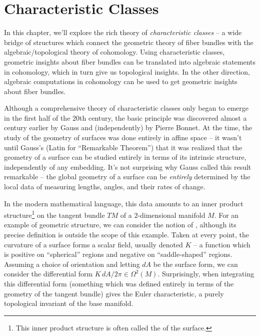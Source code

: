 \chapter{Characteristic Classes}\label{chapter:characteristic_classes}

In this chapter, we'll explore the rich theory of \emph{characteristic classes} -- a wide bridge of structures which connect the geometric theory of fiber bundles with the algebraic/topological theory of cohomology.
Using characteristic classes, geometric insights about fiber bundles can be translated into algebraic statements in cohomology, which in turn give us topological insights. In the other direction, algebraic computations in cohomology can be used to get geometric insights about fiber bundles.

Although a comprehensive theory of characteristic classes only began to emerge in the first half of the 20th century, the basic principle was discovered almost a century earlier by Gauss and (independently) by Pierre Bonnet. At the time, the study of the geometry of surfaces was done entirely in affine space -- it wasn't until Gauss's  (Latin for ``Remarkable Theorem'') that it was realized that the geometry of a surface can be studied entirely in terms of its intrinsic structure, independently of any embedding.
It's not surprising why Gauss called this result remarkable -- the global geometry of a surface can be \emph{entirely} determined by the local data of measuring lengths, angles, and their rates of change.

In the modern mathematical language, this data amounts to an inner product structure\footnote{This inner product structure is often called the  of the surface.} on the tangent bundle $TM$ of a $2$-dimensional manifold $M$. For an example of geometric structure, we can consider the notion of , although its precise definition is outside the scope of this example.
Taken at every point, the curvature of a surface forms a scalar field, usually denoted $K$ -- a function which is positive on ``spherical'' regions and negative on ``saddle-shaped'' regions. Assuming a choice of orientation and letting $dA$ be the surface form, we can consider the differential form $ K\,dA/2\pi \in \Omega^2(M)$.
Surprisingly, when integrating this differential form (something which was defined entirely in terms of the geometry of the tangent bundle) gives the Euler characteristic, a purely topological invariant of the base manifold.

